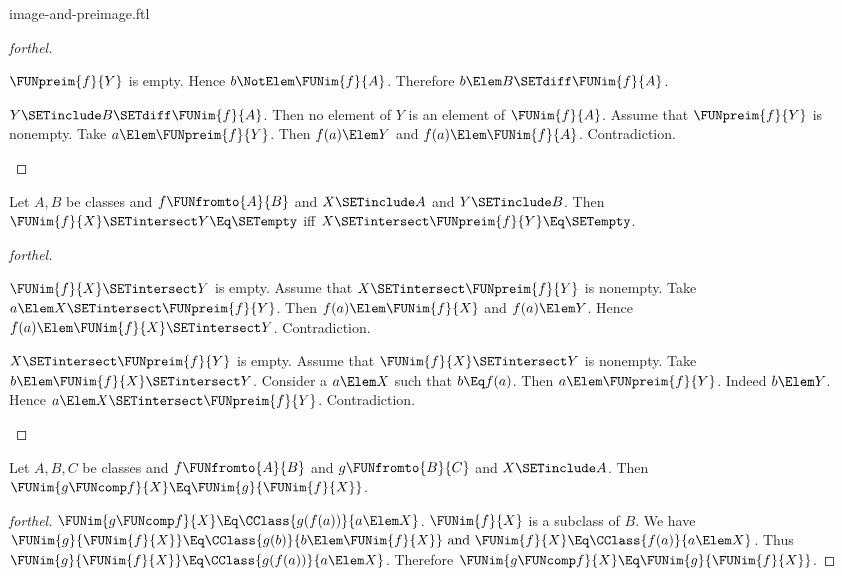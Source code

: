 \documentclass{stex}
\begin{document}
\begin{smodule}{image-and-preimage.ftl}
\begin{proof}[forthel]
\begin{case}{$\FUNpreim{f}{Y}$ is empty.}
    Hence $b \NotElem \FUNim{f}{A}$.
    Therefore $b \Elem B \SETdiff \FUNim{f}{A}$.
  \end{case}

  \begin{case}{$Y \SETinclude B \SETdiff \FUNim{f}{A}$.}
    Then no element of $Y$ is an element of $\FUNim{f}{A}$.
    Assume that $\FUNpreim{f}{Y}$ is nonempty.
    Take $a \Elem \FUNpreim{f}{Y}$.
    Then $f(a) \Elem Y$ and $f(a) \Elem \FUNim{f}{A}$.
    Contradiction.
  \end{case}
\end{proof}

\begin{proposition}[forthel]
  Let $A, B$ be classes and $f \FUNfromto{A}{B}$ and $X \SETinclude A$ and $Y \SETinclude B$.
  Then $\FUNim{f}{X} \SETintersect Y \Eq \SETempty$ iff $X \SETintersect \FUNpreim{f}{Y} \Eq \SETempty$.
\end{proposition}
\begin{proof}[forthel]
  \begin{case}{$\FUNim{f}{X} \SETintersect Y$ is empty.}
    Assume that $X \SETintersect \FUNpreim{f}{Y}$ is nonempty.
    Take $a \Elem X \SETintersect \FUNpreim{f}{Y}$.
    Then $f(a) \Elem \FUNim{f}{X}$ and $f(a) \Elem Y$.
    Hence $f(a) \Elem \FUNim{f}{X} \SETintersect Y$.
    Contradiction.
  \end{case}

  \begin{case}{$X \SETintersect \FUNpreim{f}{Y}$ is empty.}
    Assume that $\FUNim{f}{X} \SETintersect Y$ is nonempty.
    Take $b \Elem \FUNim{f}{X} \SETintersect Y$.
    Consider a $a \Elem X$ such that $b \Eq f(a)$.
    Then $a \Elem \FUNpreim{f}{Y}$.
    Indeed $b \Elem Y$.
    Hence $a \Elem X \SETintersect \FUNpreim{f}{Y}$.
    Contradiction.
  \end{case}
\end{proof}

\begin{proposition}[forthel]
  Let $A, B, C$ be classes and $f \FUNfromto{A}{B}$ and $g \FUNfromto{B}{C}$ and $X \SETinclude A$.
  Then $\FUNim{g \FUNcomp f}{X} \Eq \FUNim{g}{\FUNim{f}{X}}$.
\end{proposition}
\begin{proof}[forthel]
  $\FUNim{g \FUNcomp f}{X} \Eq \CClass{g(f(a))}{a \Elem X}$.
  $\FUNim{f}{X}$ is a subclass of $B$.
  We have $\FUNim{g}{\FUNim{f}{X}} \Eq \CClass{g(b)}{b \Elem \FUNim{f}{X}}\text{ and }\FUNim{f}{X} \Eq \CClass{f(a)}{a \Elem X}$.
  Thus $\FUNim{g}{\FUNim{f}{X}} \Eq \CClass{g(f(a))}{a \Elem X}$.
  Therefore $\FUNim{g \FUNcomp f}{X} \Eq \FUNim{g}{\FUNim{f}{X}}$.
\end{proof}


\end{smodule}
\end{document}
